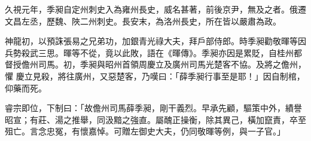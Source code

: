 \begin{pinyinscope}
 久視元年，季昶自定州刺史入為雍州長史，威名甚著，前後京尹，無及之者。俄遷文昌左丞，歷魏、陜二州刺史。長安末，為洛州長史，所在皆以嚴肅為政。



 神龍初，以預誅張易之兄弟功，加銀青光祿大夫，拜戶部侍郎。時季昶勸敬暉等因兵勢殺武三思。暉等不從，竟以此敗，語在《暉傳》。季昶亦因是累貶，自桂州都督授儋州司馬。初，季昶與昭州首領周慶立及廣州司馬光楚客不協。及將之儋州，懼
 慶立見殺，將往廣州，又惡楚客，乃嘆曰：「薛季昶行事至是耶！」因自制棺，仰藥而死。



 睿宗即位，下制曰：「故儋州司馬薛季昶，剛干義烈。早承先顧，驅策中外，績譽昭宣；有莊、湯之推舉，同汲黯之強直。屬醜正操衡，除其異己，橫加竄責，卒至殂亡。言念忠冤，有懷嘉悼。可贈左御史大夫，仍同敬暉等例，與一子官。」



\end{pinyinscope}